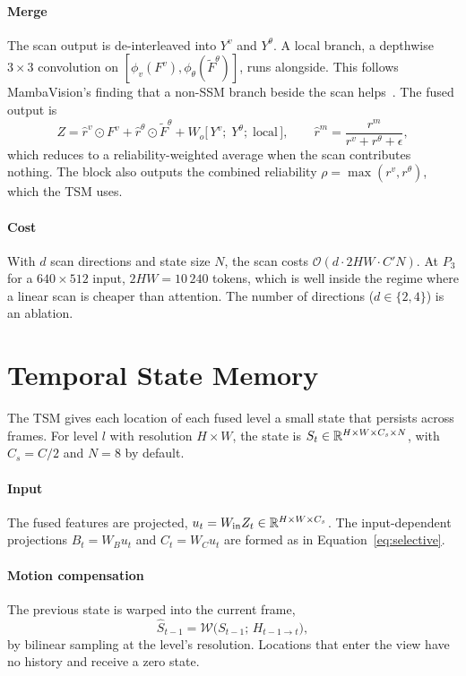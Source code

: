 \paragraph{Merge}
The scan output is de-interleaved into $Y^v$ and $Y^\theta$. A local branch,
a depthwise $3\times3$ convolution on $[\phi_v(F^v), \phi_\theta(\tilde F^\theta)]$,
runs alongside. This follows MambaVision's finding that a non-SSM branch
beside the scan helps~\citep{hatamizadeh2025mambavision}. The fused output
is
\begin{equation}
  Z = \hat r^v \odot F^v + \hat r^\theta \odot \tilde F^\theta
      + W_o\bigl[\,Y^v;\; Y^\theta;\; \text{local}\,\bigr],
  \qquad
  \hat r^m = \frac{r^m}{r^v + r^\theta + \epsilon},
  \label{eq:merge}
\end{equation}
which reduces to a reliability-weighted average when the scan contributes
nothing. The block also outputs the combined reliability
$\rho = \max(r^v, r^\theta)$, which the TSM uses.

\paragraph{Cost}
With $d$ scan directions and state size $N$, the scan costs
$\mathcal{O}(d\cdot 2HW\cdot C' N)$. At $P_3$ for a $640\times512$ input,
$2HW = 10\,240$ tokens, which is well inside the regime where a linear scan
is cheaper than attention. The number of directions ($d\in\{2,4\}$) is an
ablation.



\section{Temporal State Memory}
\label{sec:tsm}

The TSM gives each location of each fused level a small state that persists
across frames. For level $l$ with resolution $H\times W$, the state is
$S_t \in \mathbb{R}^{H\times W\times C_s\times N}$, with $C_s=C/2$ and $N=8$ by
default.

\paragraph{Input}
The fused features are projected, $u_t = W_{\text{in}} Z_t \in \mathbb{R}^{H\times W\times C_s}$.
The input-dependent projections $B_t = W_B u_t$ and $C_t = W_C u_t$ are formed
as in Equation~\eqref{eq:selective}.

\paragraph{Motion compensation}
The previous state is warped into the current frame,
\begin{equation}
  \hat S_{t-1} = \mathcal{W}\bigl(S_{t-1};\, H_{t-1\to t}\bigr),
  \label{eq:warp}
\end{equation}
by bilinear sampling at the level's resolution. Locations that enter the
view have no history and receive a zero state.

